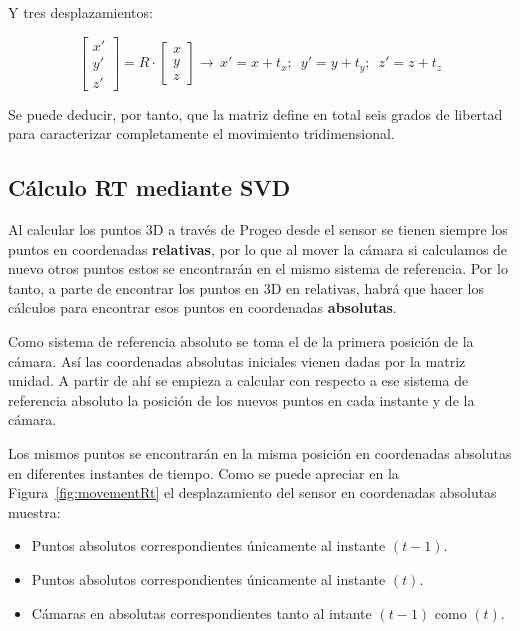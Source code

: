 Y tres desplazamientos:

\begin{equation}
\left[\begin{array}{c}
x'\\
y'\\
z'
\end{array}\right]=R\cdot\left[\begin{array}{c}
x\\
y\\
z
\end{array}\right]\longrightarrow\, x'=x+t_{x};\,\,\, y'=y+t_{y};\,\,\, z'=z+t_{z}
\end{equation}

Se puede deducir, por tanto, que la matriz define en total seis grados de libertad para caracterizar completamente el movimiento tridimensional.

\subsection{Cálculo RT mediante SVD}

Al calcular los puntos 3D a través de Progeo desde el sensor se tienen siempre los puntos en coordenadas \textbf{relativas}, por lo que al mover la cámara si calculamos de nuevo otros puntos estos se encontrarán en el mismo sistema de referencia. Por lo tanto, a parte de encontrar los puntos en 3D en relativas, habrá que hacer los cálculos para encontrar esos puntos en coordenadas \textbf{absolutas}.

Como sistema de referencia absoluto se toma el de la primera posición de la cámara. Así las coordenadas absolutas iniciales vienen dadas por la matriz unidad. A partir de ahí se empieza a calcular con respecto a ese sistema de referencia absoluto la posición de los nuevos puntos en cada instante y de la cámara.

Los mismos puntos se encontrarán en la misma posición en coordenadas absolutas en diferentes instantes de tiempo. Como se puede apreciar en la Figura~\ref{fig:movementRt} el desplazamiento del sensor en coordenadas absolutas muestra:

\begin{itemize}
\item Puntos absolutos correspondientes únicamente al instante $(t-1)$.
\item Puntos absolutos correspondientes únicamente al instante $(t)$.
\item Cámaras en absolutas correspondientes tanto al intante $(t-1)$ como $(t)$.
\end{itemize}

